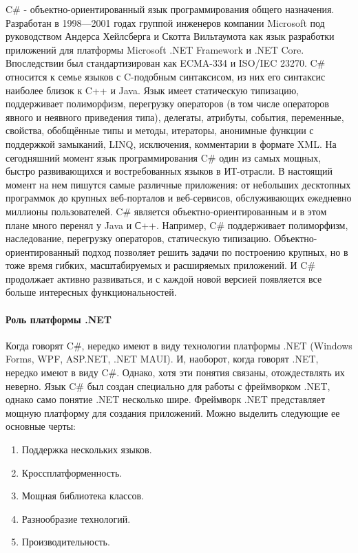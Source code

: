 C\# - объектно-ориентированный язык программирования общего назначения. Разработан в 1998—2001 годах группой инженеров компании Microsoft под руководством Андерса Хейлсберга и Скотта Вильтаумота как язык разработки приложений для платформы Microsoft .NET Framework и .NET Core. Впоследствии был стандартизирован как ECMA-334 и ISO/IEC 23270.
C\# относится к семье языков с C-подобным синтаксисом, из них его синтаксис наиболее близок к C++ и Java. Язык имеет статическую типизацию, поддерживает полиморфизм, перегрузку операторов (в том числе операторов явного и неявного приведения типа), делегаты, атрибуты, события, переменные, свойства, обобщённые типы и методы, итераторы, анонимные функции с поддержкой замыканий, LINQ, исключения, комментарии в формате XML.
На сегодняшний момент язык программирования C\# один из самых мощных, быстро развивающихся и востребованных языков в ИТ-отрасли. В настоящий момент на нем пишутся самые различные приложения: от небольших десктопных программок до крупных веб-порталов и веб-сервисов, обслуживающих ежедневно миллионы пользователей.
C\# является объектно-ориентированным и в этом плане много перенял у Java и С++. Например, C\# поддерживает полиморфизм, наследование, перегрузку операторов, статическую типизацию. Объектно-ориентированный подход позволяет решить задачи по построению крупных, но в тоже время гибких, масштабируемых и расширяемых приложений. И C\# продолжает активно развиваться, и с каждой новой версией появляется все больше интересных функциональностей.

\paragraph{Роль платформы .NET}

Когда говорят C\#, нередко имеют в виду технологии платформы .NET (Windows Forms, WPF, ASP.NET, .NET MAUI). И, наоборот, когда говорят .NET, нередко имеют в виду C\#. Однако, хотя эти понятия связаны, отождествлять их неверно. Язык C\# был создан специально для работы с фреймворком .NET, однако само понятие .NET несколько шире.
Фреймворк .NET представляет мощную платформу для создания приложений. Можно выделить следующие ее основные черты:
\begin{enumerate}
	\item Поддержка нескольких языков.
	\item Кроссплатформенность.
	\item Мощная библиотека классов.
	\item Разнообразие технологий.
	\item Производительность.
\end{enumerate}

